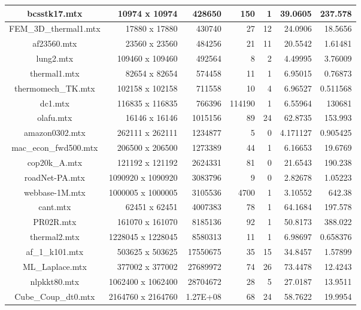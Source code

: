 \begin{table}[!htp]
\begin{adjustbox}{max width=\textwidth}
\begin{tabular}{cr|r|r|r|r|r|}
				\multicolumn{1}{|c|}{bcsstk17.mtx} & 10974 x 10974 & 428650 & 150 & 1 & 39.0605 & 237.578 \\ \hline
				\multicolumn{1}{|c|}{FEM\_3D\_thermal1.mtx} & 17880 x 17880 & 430740 & 27 & 12 & 24.0906 & 18.5656 \\ \hline
				\multicolumn{1}{|c|}{af23560.mtx} & 23560 x 23560 & 484256 & 21 & 11 & 20.5542 & 1.61481 \\ \hline
				\multicolumn{1}{|c|}{lung2.mtx} & 109460 x 109460 & 492564 & 8 & 2 & 4.49995 & 3.76009 \\ \hline
				\multicolumn{1}{|c|}{thermal1.mtx} & 82654 x 82654 & 574458 & 11 & 1 & 6.95015 & 0.76873 \\ \hline
				\multicolumn{1}{|c|}{thermomech\_TK.mtx} & 102158 x 102158 & 711558 & 10 & 4 & 6.96527 & 0.511568 \\ \hline
				\multicolumn{1}{|c|}{dc1.mtx} & 116835 x 116835 & 766396 & 114190 & 1 & 6.55964 & 130681 \\ \hline
				\multicolumn{1}{|c|}{olafu.mtx} & 16146 x 16146 & 1015156 & 89 & 24 & 62.8735 & 153.993 \\ \hline
				\multicolumn{1}{|c|}{amazon0302.mtx} & 262111 x 262111 & 1234877 & 5 & 0 & 4.171127 & 0.905425 \\ \hline
				\multicolumn{1}{|c|}{mac\_econ\_fwd500.mtx} & 206500 x 206500 & 1273389 & 44 & 1 & 6.16653 & 19.6769 \\ \hline
				\multicolumn{1}{|c|}{cop20k\_A.mtx} & 121192 x 121192 & 2624331 & 81 & 0 & 21.6543 & 190.238 \\ \hline
				\multicolumn{1}{|c|}{roadNet-PA.mtx} & 1090920 x 1090920 & 3083796 & 9 & 0 & 2.82678 & 1.05223 \\ \hline
				\multicolumn{1}{|c|}{webbase-1M.mtx} & 1000005 x 1000005 & 3105536 & 4700 & 1 & 3.10552 & 642.38 \\ \hline
				\multicolumn{1}{|c|}{cant.mtx} & 62451 x 62451 & 4007383 & 78 & 1 & 64.1684 & 197.578 \\ \hline
				\multicolumn{1}{|c|}{PR02R.mtx} & 161070 x 161070 & 8185136 & 92 & 1 & 50.8173 & 388.022 \\ \hline
				\multicolumn{1}{|c|}{thermal2.mtx} & 1228045 x 1228045 & 8580313 & 11 & 1 & 6.98697 & 0.658376 \\ \hline
				\multicolumn{1}{|c|}{af\_1\_k101.mtx} & 503625 x 503625 & 17550675 & 35 & 15 & 34.8457 & 1.57899 \\ \hline
				\multicolumn{1}{|c|}{ML\_Laplace.mtx} & 377002 x 377002 & 27689972 & 74 & 26 & 73.4478 & 12.4243 \\ \hline
				\multicolumn{1}{|c|}{nlpkkt80.mtx} & 1062400 x 1062400 & 28704672 & 28 & 5 & 27.0187 & 13.9511 \\ \hline
				\multicolumn{1}{|c|}{Cube\_Coup\_dt0.mtx} & 2164760 x 2164760 & 1.27E+08 & 68 & 24 & 58.7622 & 19.9954 \\ \hline
			\end{tabular}
		\end{adjustbox}
	\end{table}
